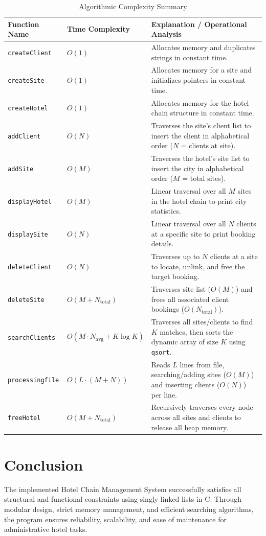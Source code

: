 \documentclass[11pt, a4paper]{article}
\begin{document}
\vspace{0.3cm}
\begin{table}[h!]
\centering
\small
\begin{tabular}{p{3.2cm} p{3.8cm} p{7.5cm}}
\toprule
\textbf{Function Name} & \textbf{Time Complexity} & \textbf{Explanation / Operational Analysis} \\
\midrule
\texttt{createClient} & $O(1)$ & Allocates memory and duplicates strings in constant time. \\
\midrule
\texttt{createSite} & $O(1)$ & Allocates memory for a site and initializes pointers in constant time. \\
\midrule
\texttt{createHotel} & $O(1)$ & Allocates memory for the hotel chain structure in constant time. \\
\midrule
\texttt{addClient} & $O(N)$ & Traverses the site's client list to insert the client in alphabetical order ($N$ = clients at site). \\
\midrule
\texttt{addSite} & $O(M)$ & Traverses the hotel's site list to insert the city in alphabetical order ($M$ = total sites). \\
\midrule
\texttt{displayHotel} & $O(M)$ & Linear traversal over all $M$ sites in the hotel chain to print city statistics. \\
\midrule
\texttt{displaySite} & $O(N)$ & Linear traversal over all $N$ clients at a specific site to print booking details. \\
\midrule
\texttt{deleteClient} & $O(N)$ & Traverses up to $N$ clients at a site to locate, unlink, and free the target booking. \\
\midrule
\texttt{deleteSite} & $O(M + N_{\text{total}})$ & Traverses site list ($O(M)$) and frees all associated client bookings ($O(N_{\text{total}})$). \\
\midrule
\texttt{searchClients} & $O(M \cdot N_{\text{avg}} + K \log K)$ & Traverses all sites/clients to find $K$ matches, then sorts the dynamic array of size $K$ using \texttt{qsort}. \\
\midrule
\texttt{processingfile} & $O(L \cdot (M + N))$ & Reads $L$ lines from file, searching/adding sites ($O(M)$) and inserting clients ($O(N)$) per line. \\
\midrule
\texttt{freeHotel} & $O(M + N_{\text{total}})$ & Recursively traverses every node across all sites and clients to release all heap memory. \\
\bottomrule
\end{tabular}
\caption{Algorithmic Complexity Summary}
\end{table}

\section{Conclusion}

The implemented Hotel Chain Management System successfully satisfies all structural and functional constraints using singly linked lists in C. Through modular design, strict memory management, and efficient searching algorithms, the program ensures reliability, scalability, and ease of maintenance for administrative hotel tasks.
\end{document}
